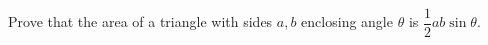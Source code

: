 Prove that the area of a triangle with sides $a,b$ enclosing angle $\theta$ is $\dfrac12ab\sin\theta$.
